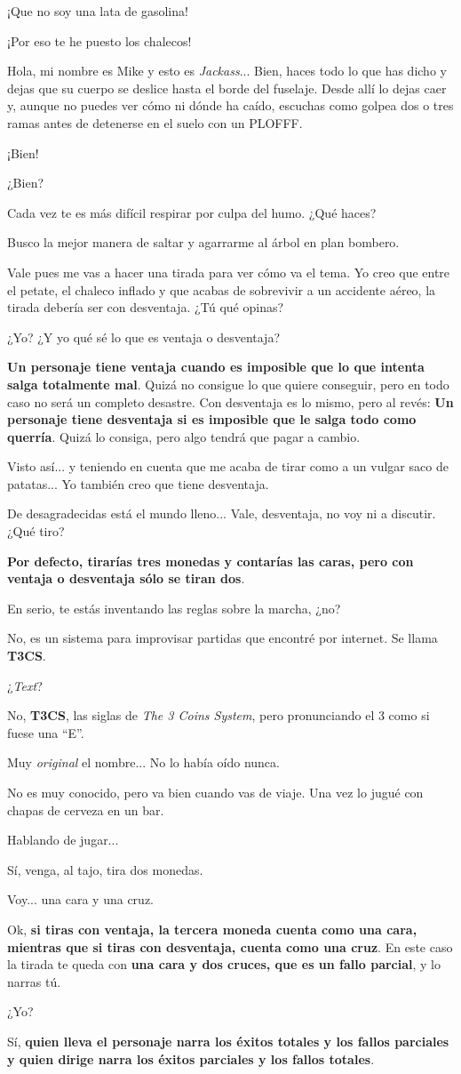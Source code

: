 \documentclass[10pt, a5paper, twocolumn]{article}
\newenvironment{dialogue}
    {\begin{description}[leftmargin=!,align=right,labelwidth=0.cm]}
    {\end{description}}
\newcommand\A{\item[\raisebox{-0.25em}{\scalebox{0.75}{\bctetraedre}}]}
\newcommand\B{\item[\raisebox{-0.25em}{\scalebox{0.75}{\bccube}}]}
\newcommand\E{\item[\raisebox{-0.25em}{\scalebox{0.75}{\bcicosaedre}}]}
\begin{document}
\begin{dialogue}
        \A ¡Que no soy una lata de gasolina!
        \B ¡Por eso te he puesto los chalecos!
        \E Hola, mi nombre es Mike y esto es \emph{Jackass}... Bien, haces todo lo que has dicho y dejas que su cuerpo se deslice hasta el borde del fuselaje. Desde allí lo dejas caer y, aunque no puedes ver cómo ni dónde ha caído, escuchas como golpea dos o tres ramas antes de detenerse en el suelo con un PLOFFF.
        \B ¡Bien!
        \A ¿Bien?
        \E Cada vez te es más difícil respirar por culpa del humo. ¿Qué haces?
        \B Busco la mejor manera de saltar y agarrarme al árbol en plan bombero.
        \E Vale pues me vas a hacer una tirada para ver cómo va el tema. Yo creo que entre el petate, el chaleco inflado y que acabas de sobrevivir a un accidente aéreo, la tirada debería ser con desventaja. ¿Tú qué opinas?
        \A ¿Yo? ¿Y yo qué sé lo que es ventaja o desventaja?
        \E \textbf{Un personaje tiene ventaja cuando es imposible que lo que intenta salga totalmente mal}. Quizá no consigue lo que quiere conseguir, pero en todo caso no será un completo desastre. Con desventaja es lo mismo, pero al revés: \textbf{Un personaje tiene desventaja si es imposible que le salga todo como querría}. Quizá lo consiga, pero algo tendrá que pagar a cambio.
        \A Visto así... y teniendo en cuenta que me acaba de tirar como a un vulgar saco de patatas... Yo también creo que tiene desventaja.
        \B De desagradecidas está el mundo lleno... Vale, desventaja, no voy ni a discutir. ¿Qué tiro?
        \E \textbf{Por defecto, tirarías tres monedas y contarías las caras, pero con ventaja o desventaja sólo se tiran dos}.
        \B En serio, te estás inventando las reglas sobre la marcha, ¿no?
        \E No, es un sistema para improvisar partidas que encontré por internet. Se llama \textbf{T3CS}.
        \B ¿\emph{Text}?
        \E No, \textbf{T3CS}, las siglas de \emph{The 3 Coins System}, pero pronunciando el 3 como si fuese una ``E''.
        \B Muy \emph{original} el nombre... No lo había oído nunca.
        \E No es muy conocido, pero va bien cuando vas de viaje. Una vez lo jugué con chapas de cerveza en un bar.
        \A Hablando de jugar...
        \E Sí, venga, al tajo, tira dos monedas.
        \B Voy... una cara y una cruz.
        \E Ok, \textbf{si tiras con ventaja, la tercera moneda cuenta como una cara, mientras que si tiras con desventaja, cuenta como una cruz}. En este caso la tirada te queda con \textbf{una cara y dos cruces, que es un fallo parcial}, y lo narras tú.
        \B ¿Yo?
        \E Sí, \textbf{quien lleva el personaje narra los éxitos totales y los fallos parciales y quien dirige narra los éxitos parciales y los fallos totales}.

\end{dialogue}
\end{document}
